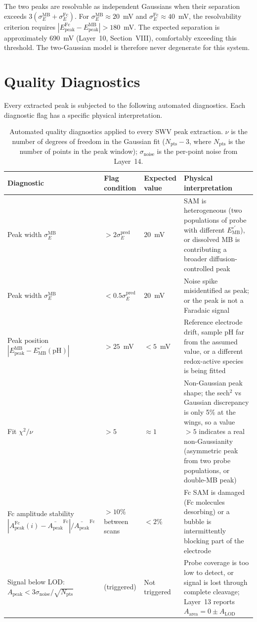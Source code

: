 \documentclass[10pt,a4paper]{article}
\numberwithin{equation}{section}
\newcommand{\Eo}{E^{\circ\prime}}
\newcommand{\Apk}{A_{\text{peak}}}
\newcommand{\Epk}{E_{\text{peak}}}
\begin{document}
The two peaks are resolvable as independent Gaussians when their separation
exceeds $3(\sigma_E^\text{MB} + \sigma_E^\text{Fc})$. For
$\sigma_E^\text{MB} \approx 20$~mV and $\sigma_E^\text{Fc} \approx 40$~mV,
the resolvability criterion requires $|\Epk^\text{Fc} - \Epk^\text{MB}|
> 180$~mV. The expected separation is approximately 690~mV (Layer~10,
Section~VIII), comfortably exceeding this threshold. The two-Gaussian model
is therefore never degenerate for this system.

\section{Quality Diagnostics}
\label{sec:qc}

Every extracted peak is subjected to the following automated diagnostics.
Each diagnostic flag has a specific physical interpretation.

\begin{table}[H]
\centering
\small\renewcommand{\arraystretch}{1.4}
\begin{tabularx}{\linewidth}{@{}p{3.5cm}p{2.5cm}p{2.5cm}X@{}}
\toprule
Diagnostic & Flag condition & Expected value & Physical interpretation \\
\midrule
Peak width $\sigma_E^\text{MB}$ & $> 2\sigma_E^\text{pred}$ & $20$~mV & SAM is heterogeneous (two populations of probe with different $\Eo_\text{MB}$), or dissolved MB is contributing a broader diffusion-controlled peak \\[0.5em]
Peak width $\sigma_E^\text{MB}$ & $< 0.5\sigma_E^\text{pred}$ & $20$~mV & Noise spike misidentified as peak; or the peak is not a Faradaic signal \\[0.5em]
Peak position $|\Epk^\text{MB} - \Eo_\text{MB}(\text{pH})|$ & $> 25$~mV & $<5$~mV & Reference electrode drift, sample pH far from the assumed value, or a different redox-active species is being fitted \\[0.5em]
Fit $\chi^2/\nu$ & $> 5$ & $\approx 1$ & Non-Gaussian peak shape; the sech$^2$ vs Gaussian discrepancy is only 5\% at the wings, so a value $> 5$ indicates a real non-Gaussianity (asymmetric peak from two probe populations, or double-MB peak) \\[0.5em]
Fc amplitude stability $|\Apk^\text{Fc}(i) - \bar{\Apk}^\text{Fc}|/\bar{\Apk}^\text{Fc}$ & $> 10\%$ between scans & $< 2\%$ & Fc SAM is damaged (Fc molecules desorbing) or a bubble is intermittently blocking part of the electrode \\[0.5em]
Signal below LOD: $\Apk < 3\sigma_\text{noise}/\sqrt{N_\text{pts}}$ & (triggered) & Not triggered & Probe coverage is too low to detect, or signal is lost through complete cleavage; Layer~13 reports $A_\text{area} = 0 \pm A_\text{LOD}$ \\[0.5em]
\bottomrule
\end{tabularx}
\caption{Automated quality diagnostics applied to every SWV peak extraction.
$\nu$ is the number of degrees of freedom in the Gaussian fit
($N_\text{pts} - 3$, where $N_\text{pts}$ is the number of points in the
peak window); $\sigma_\text{noise}$ is the per-point noise from Layer~14.}
\label{tab:qc}
\end{table}
\end{document}

